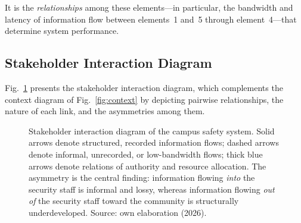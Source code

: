 \documentclass[conference]{IEEEtran}
\begin{document}
It is the \emph{relationships} among these elements---in particular,
the bandwidth and latency of information flow between
elements~1 and~5 through element~4---that determine system
performance.

\subsection{Stakeholder Interaction Diagram}
\label{sec:stakeholderdiagram}
Fig.~\ref{fig:stakeholder} presents the stakeholder interaction
diagram, which complements the context diagram of
Fig.~\ref{fig:context} by depicting pairwise relationships, the
nature of each link, and the asymmetries among them.

\begin{figure}[h]
\centering
{}
\caption{Stakeholder interaction diagram of the campus safety system.
Solid arrows denote structured, recorded information flows; dashed
arrows denote informal, unrecorded, or low-bandwidth flows; thick
blue arrows denote relations of authority and resource allocation.
The asymmetry is the central finding: information flowing
\emph{into} the security staff is informal and lossy, whereas
information flowing \emph{out of} the security staff toward the
community is structurally underdeveloped. Source: own elaboration (2026).}
\label{fig:stakeholder}
\end{figure}
\end{document}
